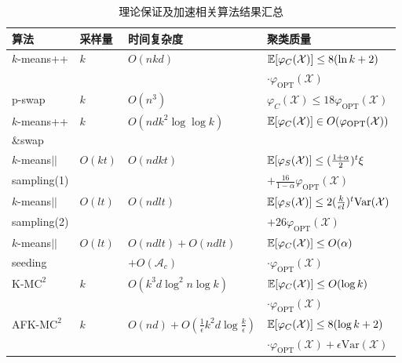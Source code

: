 {\fontsize{10}{12}\selectfont

	\begin{longtable}{llll}
		\caption{理论保证及加速相关算法结果汇总}
		\label{tab: kmeans_algorithms} \\
		\toprule
		算法 & 采样量 & 时间复杂度 & 聚类质量 \\
		\midrule
		\multirow{2}{*}{$k$-means++} & \multirow{2}{*}{$k$} & \multirow{2}{*}{$O(nkd)$} & $\mathbb{E}[\varphi_C(\mathcal{X})] \leq 8(\ln k + 2)$\\
		& & & $\cdot \varphi_{\text{OPT}}(\mathcal{X})$ \\
		p-swap & $k$ & $O(n^3)$ & $\varphi_C(\mathcal{X}) \leq 18 \varphi_{\text{OPT}}(\mathcal{X})$ \\
		
		$k$-means++ & \multirow{2}{*}{$k$} & \multirow{2}{*}{$O(ndk^2 \log\log k)$} & \multirow{2}{*}{$\mathbb{E}[\varphi_C(\mathcal{X})] \in O(\varphi_{\text{OPT}}(\mathcal{X}))$}\\
		\&swap & & & \\

		$k$-means\(\vert \vert\) & \multirow{2}{*}{$O(kt)$} & \multirow{2}{*}{$O(ndkt)$} & $\mathbb{E}[\varphi_S(\mathcal{X})] \leq (\frac{1+\alpha}{2})^t \xi$\\
		sampling(1) & & & $+\frac{16}{1-\alpha} \varphi_{\text{OPT}}(\mathcal{X})$ \\
		
		$k$-means\(\vert \vert\) & \multirow{2}{*}{$O(lt)$} & \multirow{2}{*}{$O(ndlt)$} & $\mathbb{E}[\varphi_S(\mathcal{X})] \leq 2(\frac{k}{el})^t \text{Var}(\mathcal{X})$ \\
		sampling(2) & & & $+ 26\varphi_{\text{OPT}}(\mathcal{X})$\\

		$k$-means\(\vert \vert\)& \multirow{2}{*}{$O(lt)$} & $O(ndlt)+O(ndlt)$ & $\mathbb{E}[\varphi_C(\mathcal{X})] \leq O(\alpha)$ \\
		seeding & & $+O(\mathcal{A}_c)$ & $\cdot \varphi_{\text{OPT}}(\mathcal{X})$ \\

		\multirow{2}{*}{K-M$\text{C}^2$} & \multirow{2}{*}{$k$} & \multirow{2}{*}{$O(k^3 d \log^2 n \log k)$} & $\mathbb{E}[\varphi_C(\mathcal{X})] \leq O(\log k)$  \\
		& & & $\cdot \varphi_{\text{OPT}}(\mathcal{X})$ \\

		\multirow{2}{*}{AFK-M$\text{C}^2$} & \multirow{2}{*}{$k$} & \multirow{2}{*}{$O(nd)+O(\frac{1}{\epsilon}k^2 d\log \frac{k}{\epsilon})$}& $\mathbb{E}[\varphi_C(\mathcal{X})]\leq 8(\log k+2)$ \\
		& & & $\cdot \varphi_{\text{OPT}}(\mathcal{X}) + \epsilon\text{Var}(\mathcal{X})$ \\


\end{longtable}}
